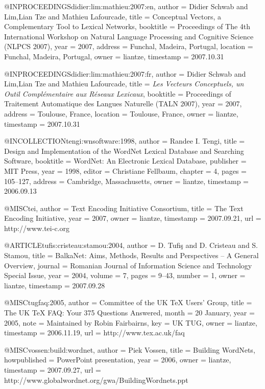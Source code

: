 @INPROCEEDINGS{didier:lim:mathieu:2007:en,
  author = {Didier Schwab and Lim,Lian Tze and Mathieu Lafourcade},
  title = {Conceptual Vectors, a Complementary Tool to Lexical Networks},
  booktitle = {Proceedings of The 4th International Workshop on Natural Language
	Processing and Cognitive Science (NLPCS 2007)},
  year = {2007},
  address = {Funchal, Madeira, Portugal},
  location = {Funchal, Madeira, Portugal},
  owner = {liantze},
  timestamp = {2007.10.31}
}

@INPROCEEDINGS{didier:lim:mathieu:2007:fr,
  author = {Didier Schwab and Lim,Lian Tze and Mathieu Lafourcade},
  title = {\emph{Les Vecteurs Conceptuels, un Outil Compl\'{e}mentaire aux R\'{e}seaux
	Lexicaux}},
  booktitle = {Proceedings of Traitement Automatique des Langues Naturelle (TALN
	2007)},
  year = {2007},
  address = {Toulouse, France},
  location = {Toulouse, France},
  owner = {liantze},
  timestamp = {2007.10.31}
}

@INCOLLECTION{tengi:wnsoftware:1998,
  author = {Randee I. Tengi},
  title = {Design and Implementation of the WordNet Lexical Database and Searching
	Software},
  booktitle = {WordNet: An Electronic Lexical Database},
  publisher = {MIT Press},
  year = {1998},
  editor = {Christiane Fellbaum},
  chapter = {4},
  pages = {105--127},
  address = {Cambridge, Massachusetts},
  owner = {liantze},
  timestamp = {2006.09.13}
}

@MISC{tei,
  author = {{Text Encoding Initiative Consortium}},
  title = {{The Text Encoding Initiative}},
  year = {2007},
  owner = {liantze},
  timestamp = {2007.09.21},
  url = {http://www.tei-c.org}
}

@ARTICLE{tufis:cristeau:stamou:2004,
  author = {D. Tufi{\c s} and D. Cristeau and S. Stamou},
  title = {{BalkaNet}: Aims, Methods, Results and Perspectives -- A General
	Overview},
  journal = {Romanian Journal of Information Science and Technology Special Issue},
  year = {2004},
  volume = {7},
  pages = {9--43},
  number = {1},
  owner = {liantze},
  timestamp = {2007.09.28}
}

@MISC{tugfaq:2005,
  author = {Committee of the UK \TeX{} Users' Group},
  title = {The {UK \TeX{} FAQ}: Your 375 Questions Answered},
  month = {20 January},
  year = {2005},
  note = {Maintained by Robin Fairbairns},
  key = {UK TUG},
  owner = {liantze},
  timestamp = {2006.11.19},
  url = {http://www.tex.ac.uk/faq}
}

@MISC{vossen:build:wordnet,
  author = {Piek Vossen},
  title = {Building WordNets},
  howpublished = {PowerPoint presentation},
  year = {2006},
  owner = {liantze},
  timestamp = {2007.09.27},
  url = {http://www.globalwordnet.org/gwa/BuildingWordnets.ppt}
}

